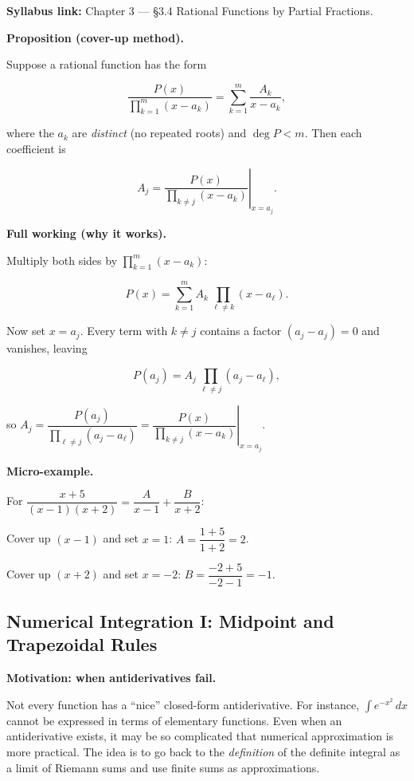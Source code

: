 \begin{extension}[title={Extension (Beyond Syllabus: Heaviside cover-up for distinct linear factors)}]

\textbf{Syllabus link:} Chapter 3 — \S3.4 Rational Functions by Partial Fractions.

\textbf{Proposition (cover-up method).}

Suppose a rational function has the form

\[
\frac{P(x)}{\prod_{k=1}^{m}(x-a_k)}
=\sum_{k=1}^{m}\frac{A_k}{x-a_k},
\]

where the $a_k$ are \emph{distinct} (no repeated roots) and $\deg P<m$. Then each coefficient is

\[
A_j = \left.\frac{P(x)}{\prod_{k\neq j}(x-a_k)}\right|_{x=a_j}.
\]

\textbf{Full working (why it works).}

Multiply both sides by $\prod_{k=1}^{m}(x-a_k)$:

\[
P(x)=\sum_{k=1}^{m}A_k\,\prod_{\ell\neq k}(x-a_\ell).
\]

Now set $x=a_j$. Every term with $k\neq j$ contains a factor $(a_j-a_j)=0$ and vanishes, leaving

\[
P(a_j) = A_j\,\prod_{\ell\neq j}(a_j-a_\ell),
\]

so $A_j = \dfrac{P(a_j)}{\prod_{\ell\neq j}(a_j-a_\ell)}
= \left.\dfrac{P(x)}{\prod_{k\neq j}(x-a_k)}\right|_{x=a_j}$.

\textbf{Micro-example.}

For $\dfrac{x+5}{(x-1)(x+2)}=\dfrac{A}{x-1}+\dfrac{B}{x+2}$:

Cover up $(x-1)$ and set $x=1$: $A = \dfrac{1+5}{1+2}=2$.

Cover up $(x+2)$ and set $x=-2$: $B = \dfrac{-2+5}{-2-1}=-1$.

\end{extension}

\subsection{Numerical Integration I: Midpoint and Trapezoidal Rules}

\textbf{Motivation: when antiderivatives fail.}

Not every function has a ``nice'' closed-form antiderivative. For instance, $\int e^{-x^2}\,dx$ cannot be expressed in terms of elementary functions. Even when an antiderivative exists, it may be so complicated that numerical approximation is more practical. The idea is to go back to the \emph{definition} of the definite integral as a limit of Riemann sums and use finite sums as approximations.


